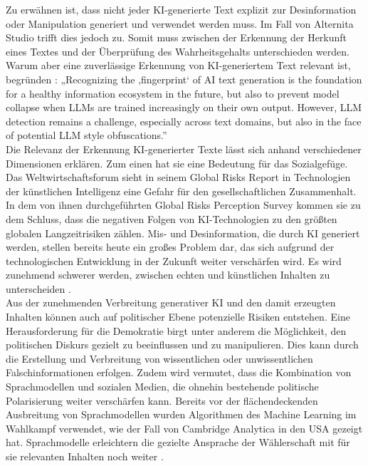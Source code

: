 Zu erwähnen ist, dass nicht jeder KI-generierte Text explizit zur Desinformation oder Manipulation generiert und verwendet werden muss. Im Fall von Alternita Studio trifft dies jedoch zu. Somit muss zwischen der Erkennung der Herkunft eines Textes und der Überprüfung des Wahrheitsgehalts unterschieden werden. \\
Warum aber eine zuverlässige Erkennung von KI-generiertem Text relevant ist, begründen \autocite{bevendorff2026overviewpan2026voightkampff}:
„Recognizing the ‚fingerprint‘ of AI text generation is the foundation for a healthy information
ecosystem in the future, but also to prevent model collapse when LLMs are trained increasingly
on their own output. However, LLM detection remains a challenge, especially across text
domains, but also in the face of potential LLM style obfuscations.” \\
Die Relevanz der Erkennung KI-generierter Texte lässt sich anhand verschiedener Dimensionen erklären. Zum einen hat sie eine Bedeutung für das Sozialgefüge. Das Weltwirtschaftsforum sieht in seinem Global Risks Report in Technologien der künstlichen Intelligenz eine Gefahr für den gesellschaftlichen Zusammenhalt. In dem von ihnen durchgeführten Global Risks Perception Survey kommen sie zu dem Schluss, dass die negativen Folgen von KI-Technologien zu den größten globalen Langzeitrisiken zählen. Mis- und Desinformation, die durch KI generiert werden, stellen bereits heute ein großes Problem dar, das sich aufgrund der technologischen Entwicklung in der Zukunft weiter verschärfen wird. Es wird zunehmend schwerer werden, zwischen echten und künstlichen Inhalten zu unterscheiden \autocite{WEF_GlobalRisks_2026}. \\
Aus der zunehmenden Verbreitung generativer KI und den damit erzeugten Inhalten können auch auf politischer Ebene potenzielle Risiken entstehen. Eine Herausforderung für die Demokratie birgt unter anderem die Möglichkeit, den politischen Diskurs gezielt zu beeinflussen und zu manipulieren. Dies kann durch die Erstellung und Verbreitung von wissentlichen oder unwissentlichen Falschinformationen erfolgen. Zudem wird vermutet, dass die Kombination von Sprachmodellen und sozialen Medien, die ohnehin bestehende politische Polarisierung weiter verschärfen kann. Bereits vor der flächendeckenden Ausbreitung von Sprachmodellen wurden Algorithmen des Machine Learning im Wahlkampf verwendet, wie der Fall von Cambridge Analytica in den USA gezeigt hat. Sprachmodelle erleichtern die gezielte Ansprache der Wählerschaft mit für sie relevanten Inhalten noch weiter \autocite{coeckelbergh2025}.
